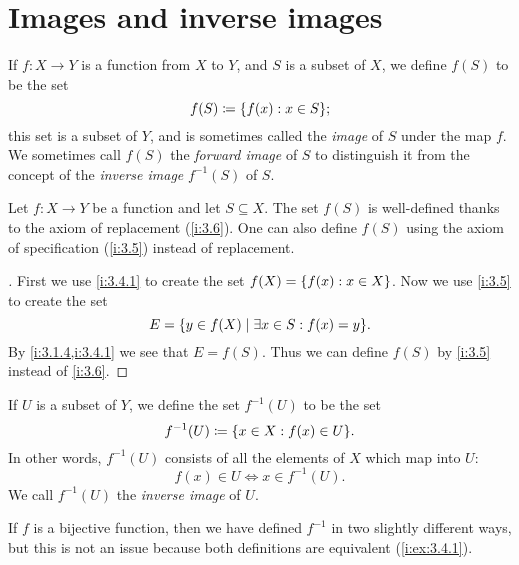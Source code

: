\section{Images and inverse images}\label{i:sec:3.4}

\begin{defn}\label{i:3.4.1}
  If \(f : X \to Y\) is a function from \(X\) to \(Y\), and \(S\) is a subset of \(X\), we define \(f(S)\) to be the set
  \[
    f(S) \coloneqq \set{f(x) : x \in S};
  \]
  this set is a subset of \(Y\), and is sometimes called the \emph{image} of \(S\) under the map \(f\).
  We sometimes call \(f(S)\) the \emph{forward image} of \(S\) to distinguish it from the concept of the \emph{inverse image} \(f^{-1}(S)\) of \(S\).
\end{defn}

\begin{ac}\label{i:ac:3.4.1}
  Let \(f : X \to Y\) be a function and let \(S \subseteq X\).
  The set \(f(S)\) is well-defined thanks to the axiom of replacement (\cref{i:3.6}).
  One can also define \(f(S)\) using the axiom of specification (\cref{i:3.5}) instead of replacement.
\end{ac}

\begin{proof}[]
  First we use \cref{i:3.4.1} to create the set \(f(X) = \left\lbrace f(x) : x \in X\right\rbrace\).
  Now we use \cref{i:3.5} to create the set
  \[
    E = \set{y \in f(X) \mid \exists x \in S : f(x) = y}.
  \]
  By \cref{i:3.1.4,i:3.4.1} we see that \(E = f(S)\).
  Thus we can define \(f(S)\) by \cref{i:3.5} instead of \cref{i:3.6}.
\end{proof}

\setcounter{thm}{3}
\begin{defn}\label{i:3.4.4}
  If \(U\) is a subset of \(Y\), we define the set \(f^{-1}(U)\) to be the set
  \[
    f^{-1}(U) \coloneqq \set{x \in X : f(x) \in U}.
  \]
  In other words, \(f^{-1}(U)\) consists of all the elements of \(X\) which map into \(U\):
  \[
    f(x) \in U \iff x \in f^{-1}(U).
  \]
  We call \(f^{-1}(U)\) the \emph{inverse image} of \(U\).
\end{defn}

\setcounter{thm}{6}
\begin{rmk}\label{i:3.4.6}
  If \(f\) is a bijective function, then we have defined \(f^{-1}\) in two slightly different ways, but this is not an issue because both definitions are equivalent (\cref{i:ex:3.4.1}).
\end{rmk}

